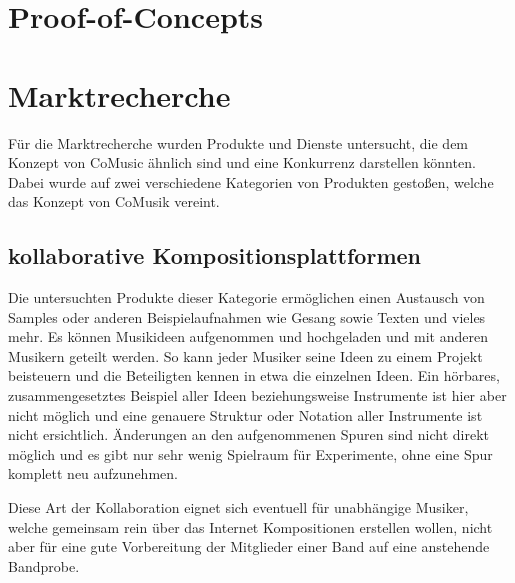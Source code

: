 \documentclass[12pt]{scrartcl}
\begin{document}

\section{Proof-of-Concepts}



















\section{Marktrecherche}


Für die Marktrecherche wurden Produkte und Dienste untersucht, die dem Konzept von CoMusic ähnlich sind und eine Konkurrenz darstellen könnten. Dabei wurde auf zwei verschiedene Kategorien von Produkten gestoßen, welche das Konzept von CoMusik vereint.

\subsection{kollaborative Kompositionsplattformen}

Die untersuchten Produkte dieser Kategorie ermöglichen einen Austausch von Samples oder anderen Beispielaufnahmen wie Gesang sowie Texten und vieles mehr. Es können Musikideen aufgenommen und hochgeladen und mit anderen Musikern geteilt werden. So kann jeder Musiker seine Ideen zu einem Projekt beisteuern und die Beteiligten kennen in etwa die einzelnen Ideen. Ein hörbares, zusammengesetztes Beispiel aller Ideen beziehungsweise Instrumente ist hier aber nicht möglich und eine genauere Struktur oder Notation aller Instrumente ist nicht ersichtlich. Änderungen an den aufgenommenen Spuren sind nicht direkt möglich und es gibt nur sehr wenig Spielraum für Experimente, ohne eine Spur komplett neu aufzunehmen.

Diese Art der Kollaboration eignet sich eventuell für unabhängige Musiker, welche gemeinsam rein über das Internet Kompositionen erstellen wollen, nicht aber für eine gute Vorbereitung der Mitglieder einer Band auf eine anstehende Bandprobe.
\end{document}
